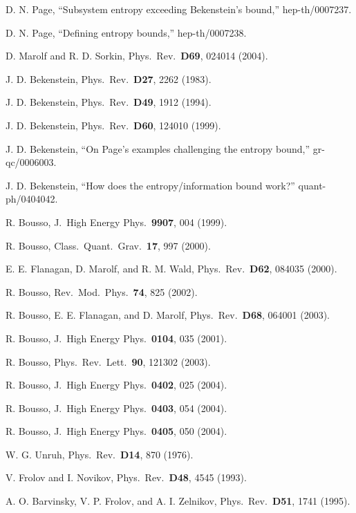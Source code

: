 \documentclass[12pt]{article} \usepackage{latexsym} \textwidth 15cm
\begin{document}
\begin{thebibliography}{99}
 D. N. Page, ``Subsystem entropy exceeding
  Bekenstein's bound,'' hep-th/0007237.

 D. N. Page, ``Defining entropy bounds,''
  hep-th/0007238.

 D. Marolf and R. D. Sorkin, Phys.\ Rev.\ {\bf D69}, 024014
  (2004).

 J. D. Bekenstein, Phys.\ Rev.\ {\bf D27}, 2262 (1983).

 J. D. Bekenstein, Phys.\ Rev.\ {\bf D49}, 1912 (1994).

 J. D. Bekenstein, Phys.\ Rev.\ {\bf D60}, 124010
  (1999).

 J. D. Bekenstein, ``On Page's examples challenging the
  entropy bound,'' gr-qc/0006003.

 J. D. Bekenstein, ``How does the entropy/information
  bound work?'' quant-ph/0404042.

 R. Bousso, J.\ High Energy Phys.\ {\bf 9907}, 004
  (1999).

 R. Bousso, Class.\ Quant.\ Grav.\ {\bf 17}, 997
  (2000).

 E. E. Flanagan, D. Marolf, and R. M. Wald, Phys.\ Rev.\
  {\bf D62}, 084035 (2000).

 R. Bousso, Rev.\ Mod.\ Phys.\ {\bf 74}, 825 (2002).

 R. Bousso, E. E. Flanagan, and D. Marolf, Phys.\ Rev.\
  {\bf D68}, 064001 (2003).

 R. Bousso, J.\ High Energy Phys.\ {\bf 0104}, 035
  (2001).

 R. Bousso, Phys.\ Rev.\ Lett.\ {\bf 90}, 121302 (2003).

\bibitem{Bousso04a} R. Bousso, J.\ High Energy Phys.\ {\bf 0402}, 025
  (2004).

 R. Bousso, J.\ High Energy Phys.\ {\bf 0403}, 054
  (2004).

 R. Bousso, J.\ High Energy Phys.\ {\bf 0405}, 050
  (2004).

 W. G. Unruh, Phys.\ Rev.\ {\bf D14}, 870 (1976).

\bibitem{FN} V. Frolov and I. Novikov, Phys.\ Rev.\ {\bf D48}, 4545
  (1993).

 A. O. Barvinsky, V. P. Frolov, and A. I. Zelnikov,
  Phys.\ Rev.\ {\bf D51}, 1741 (1995).


\end{thebibliography}
\end{document}
